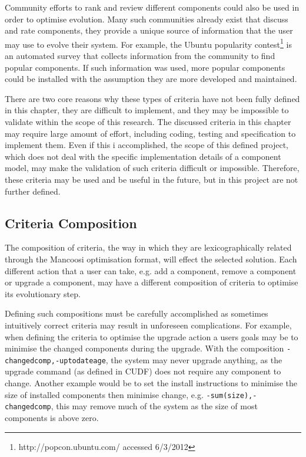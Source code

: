Community efforts to rank and review different components could also be used in order to optimise evolution.
Many such communities already exist that discuss and rate components, they provide a unique source of information that the user may use to evolve their system.
For example, the Ubuntu popularity contest\footnote{http://popcon.ubuntu.com/ accessed 6/3/2012} is an automated survey that collects information from the community to find popular components.
If such information was used, more popular components could be installed with the assumption they are more developed and maintained.

There are two core reasons why these types of criteria have not been fully defined in this chapter,
they are difficult to implement, and they may be impossible to validate within the scope of this research.
The discussed criteria in this chapter may require large amount of effort, including coding, testing and specification to implement them.
Even if this i accomplished, the scope of this defined project, which does not deal with the specific implementation details of a component model,
may make the validation of such criteria difficult or impossible.
Therefore, these criteria may be used and be useful in the future, but in this project are not further defined.

\subsection{Criteria Composition}
The composition of criteria, the way in which they are lexicographically related through the Mancoosi optimisation format,
will effect the selected solution.
Each different action that a user can take, e.g. add a component, remove a component or upgrade a component, may have a different composition of criteria to optimise its evolutionary step.

Defining such compositions must be carefully accomplished as sometimes intuitively correct criteria may result in unforeseen complications.
For example, when defining the criteria to optimise the upgrade action a users goals may be to minimise the changed components during the upgrade.
With the composition \verb+-changedcomp,-uptodateage+, the system may never upgrade anything, as the upgrade command (as defined in CUDF) does not require any component to change.
Another example would be to set the install instructions to minimise the size of installed components then minimise change,
e.g. \verb!-sum(size),-changedcomp!, this may remove much of the system as the size of most components is above zero.

